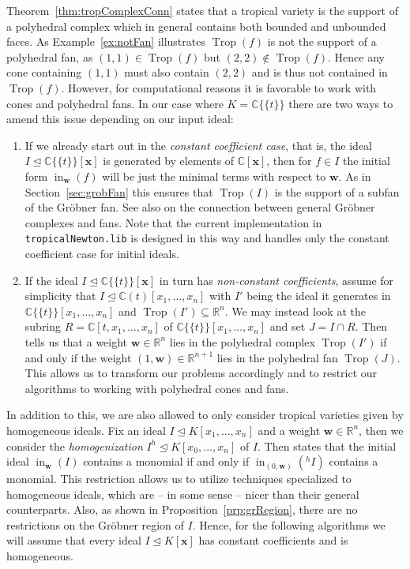 \documentclass[
  paper=a4,
  titlepage,
  bibliography=totoc,
  pagesize=pdftex
]{scrartcl}
\numberwithin{figure}{section}
\numberwithin{equation}{section}
\numberwithin{table}{section}
\newcommand*\setR{\mathds{R}}
\newcommand*\setC{\mathds{C}}
\newcommand*\puiseux[2]{#1\{\!\{#2\}\!\}}
\newcommand*\CCt{\puiseux{\setC}{t}}
\let\vec\mathbf
\let\idealof\trianglelefteq
\DeclareMathOperator{\Trop}{Trop}
\DeclareMathOperator{\initial}{in}
\theoremstyle{definition}
\numberwithin{definition}{section}
\begin{document}
Theorem~\ref{thm:tropComplexConn} states that a tropical variety is the support of a
polyhedral complex which in general contains both bounded and unbounded faces. As
Example~\ref{ex:notFan} illustrates $\Trop(f)$ is not the support of a polyhedral fan, as
$(1,1) \in \Trop(f)$ but $(2,2) \not\in \Trop(f)$. Hence any cone containing $(1,1)$ must
also contain $(2,2)$ and is thus not contained in $\Trop(f)$. However, for computational
reasons it is favorable to work with cones and polyhedral fans. In our case where $K =
\CCt$ there are two ways to amend this issue depending on our input ideal:
\begin{enumerate}[label=\arabic*.]
  \item If we already start out in the \emph{constant coefficient case}, that is, the
    ideal $I \idealof \CCt[\vec x]$ is generated by elements of $\setC[\vec x]$, then for
    $f \in I$ the initial form $\initial_{\vec w}(f)$ will be just the minimal terms with
    respect to $\vec w$. As in Section~\ref{sec:grobFan} this ensures that $\Trop(I)$ is
    the support of a subfan of the Gröbner fan. See also
    \cite[Remark~2.5.11]{sturmMacTrop} on the connection between general Gröbner complexes
    and fans. Note that the current implementation in \texttt{tropicalNewton.lib}
    \cite{tropNewtLib} is designed in this way and handles only the constant coefficient
    case for initial ideals.
  \item If the ideal $I\idealof\CCt[\vec x]$ in turn has \emph{non-constant coefficients},
    assume for simplicity that $I \idealof \setC(t)[x_1, \dots, x_n]$ with $I'$ being the
    ideal it generates in $\CCt[x_1, \dots, x_n]$ and $\Trop(I') \subseteq \setR^n$. We
    may instead look at the subring $R = \setC[t, x_1, \dots, x_n]$ of $\CCt[x_1, \dots,
    x_n]$ and set $J = I\cap R$. Then \cite[Lemma~1.1]{compTropVar} tells us that a weight
    $\vec w \in \setR^n$ lies in the polyhedral complex $\Trop(I')$ if and only if the
    weight $(1,\vec w) \in \setR^{n+1}$ lies in the polyhedral fan $\Trop(J)$. This allows
    us to transform our problems accordingly and to restrict our algorithms to working
    with polyhedral cones and fans.
\end{enumerate}
In addition to this, we are also allowed to only consider tropical varieties given by
homogeneous ideals. Fix an ideal $I\idealof K[x_1, \dots, x_n]$ and a weight $\vec w \in
\setR^n$, then we consider the \emph{homogenization} $I^h \idealof K[x_0, \dots, x_n]$ of
$I$. Then \cite[Lemma~2.2]{compTropVar} states that the initial ideal $\initial_{\vec
w}(I)$ contains a monomial if and only if $\initial_{(0,\vec w)}(^hI)$ contains a
monomial. This restriction allows us to utilize techniques specialized to homogeneous
ideals, which are -- in some sense -- nicer than their general counterparts. Also, as
shown in Proposition~\ref{prp:grRegion}, there are no restrictions on the Gröbner region
of $I$. Hence, for the following algorithms we will assume that every ideal $I \idealof
K[\vec x]$ has constant coefficients and is homogeneous.
\end{document}
